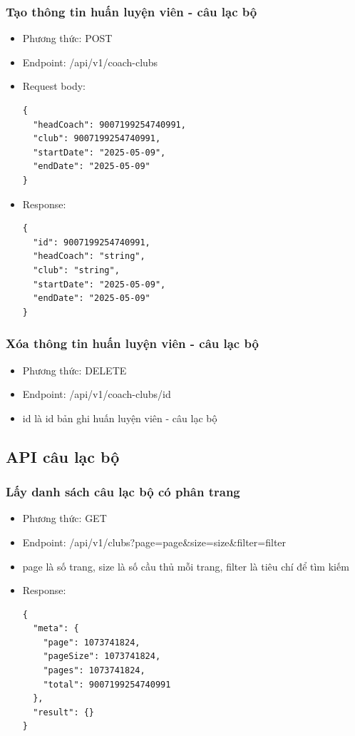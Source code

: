 \documentclass[../BTL.tex]{subfiles}
\begin{document}
\subsubsection{ Tạo thông tin huấn luyện viên - câu lạc bộ}
\begin{itemize}
    \item Phương thức: POST
    \item Endpoint: /api/v1/coach-clubs
    \item Request body:
        \begin{verbatim}
{
  "headCoach": 9007199254740991,
  "club": 9007199254740991,
  "startDate": "2025-05-09",
  "endDate": "2025-05-09"
}
        \end{verbatim}
    \item Response:
        \begin{verbatim}
{
  "id": 9007199254740991,
  "headCoach": "string",
  "club": "string",
  "startDate": "2025-05-09",
  "endDate": "2025-05-09"
}
        \end{verbatim}
\end{itemize}

\subsubsection{ Xóa thông tin huấn luyện viên - câu lạc bộ}
\begin{itemize}
    \item Phương thức: DELETE
    \item Endpoint: /api/v1/coach-clubs/{id}
    \item {id} là id bản ghi huấn luyện viên - câu lạc bộ
\end{itemize}
\subsection{ API câu lạc bộ}
\subsubsection{ Lấy danh sách câu lạc bộ có phân trang}
\begin{itemize}
    \item Phương thức: GET
    \item Endpoint: /api/v1/clubs?page={page}\&size={size}\&filter={filter}
    \item {page} là số trang, {size} là số cầu thủ mỗi trang, {filter} là tiêu chí để tìm kiếm
    \item Response:
        \begin{verbatim}
{
  "meta": {
    "page": 1073741824,
    "pageSize": 1073741824,
    "pages": 1073741824,
    "total": 9007199254740991
  },
  "result": {}
}
        \end{verbatim}
\end{itemize}
\end{document}
